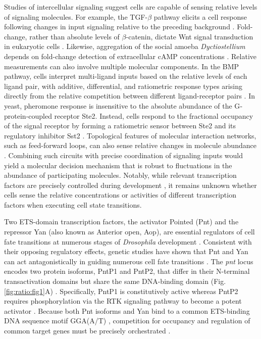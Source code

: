 Studies of intercellular signaling suggest cells are capable of sensing relative levels of signaling molecules. For example, the TGF-$\beta$ pathway elicits a cell response following changes in input signaling relative to the preceding background \cite{Frick2017}. Fold-change, rather than absolute levels of $\beta$-catenin, dictate Wnt signal transduction in eukaryotic cells \cite{Goentoro2009a}. Likewise, aggregation of the social amoeba \textit{Dyctiostellium} depends on fold-change detection of extracellular cAMP concentrations \cite{Kamino2017}. Relative measurements can also involve multiple molecular components. In the BMP pathway, cells interpret multi-ligand inputs based on the relative levels of each ligand pair, with additive, differential, and ratiometric response types arising directly from the relative competition between different ligand-receptor pairs \cite{Antebi2017}. In yeast, pheromone response is insensitive to the absolute abundance of the G‐protein‐coupled receptor Ste2. Instead, cells respond to the fractional occupancy of the signal receptor by forming a ratiometric sensor between Ste2 and its regulatory inhibitor Sst2 \cite{Bush2016}. Topological features of molecular interaction networks, such as feed-forward loops, can also sense relative changes in molecule abundance \cite{Goentoro2009,Adler2018}. Combining such circuits with precise coordination of signaling inputs would yield a molecular decision mechanism that is robust to fluctuations in the abundance of participating molecules. Notably, while relevant transcription factors are precisely controlled during development \cite{Doe2017,Erclik2017}, it remains unknown whether cells sense the relative concentrations or activities of different transcription factors when executing cell state transitions.

Two ETS-domain transcription factors, the activator Pointed (Pnt) and the repressor Yan (also known as Anterior open, Aop), are essential regulators of cell fate transitions at numerous stages of \textit{Drosophila} development \cite{Gabay1996,Halfon2000,Morimoto1996,Xu2000,Flores2000}. Consistent with their opposing regulatory effects, genetic studies have shown that Pnt and Yan can act antagonistically in guiding numerous cell fate transitions \cite{Brunner1994,ONeill1994a,Gabay1996,Halfon2000}. The \textit{pnt} locus encodes two protein isoforms, PntP1 and PntP2, that differ in their N-terminal transactivation domains but share the same DNA-binding domain (Fig. \ref{fig:ratio:fig1}A) \cite{Klambt1993,Scholz1993}. Specifically, PntP1 is constitutively active whereas PntP2 requires phosphorylation via the RTK signaling pathway to become a potent activator \cite{ONeill1994a,Brunner1994}. Because both Pnt isoforms and Yan bind to a common ETS-binding DNA sequence motif GGA(A/T) \cite{Wei2010}, competition for occupancy and regulation of common target genes must be precisely orchestrated \cite{ONeill1994a,Halfon2000,Flores2000,Xu2000,Webber2013,Webber2013a,BoisclairLachance2018,Webber2018}.


